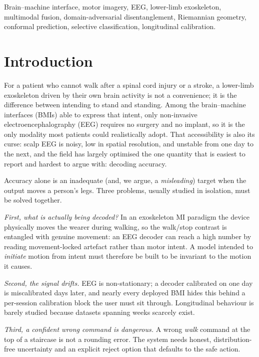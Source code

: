 \documentclass[conference]{IEEEtran}
\begin{document}
\begin{IEEEkeywords}
Brain--machine interface, motor imagery, EEG, lower-limb exoskeleton, multimodal
fusion, domain-adversarial disentanglement, Riemannian geometry, conformal
prediction, selective classification, longitudinal calibration.
\end{IEEEkeywords}

\section{Introduction}
For a patient who cannot walk after a spinal cord injury or a
stroke, a lower-limb exoskeleton driven by their own brain activity is not a
convenience; it is the difference between intending to stand and standing. Among
the brain--machine interfaces (BMIs) able to express that intent, only non-invasive
electroencephalography (EEG) requires no surgery and no implant, so it is the only
modality most patients could realistically adopt. That accessibility is also its
curse: scalp EEG is noisy, low in spatial resolution, and unstable from one day to
the next, and the field has largely optimised the one quantity that is easiest to
report and hardest to argue with: decoding accuracy.

Accuracy alone is an inadequate (and, we argue, a \emph{misleading}) target when
the output moves a person's legs. Three problems, usually studied in isolation, must
be solved together.

\emph{First, what is actually being decoded?} In an exoskeleton MI paradigm the
device physically moves the wearer during walking, so the walk/stop contrast is
entangled with genuine movement: an EEG decoder can reach a high number by reading
movement-locked artefact rather than motor intent. A model intended to
\emph{initiate} motion from intent must therefore be built to be invariant to the
motion it causes.

\emph{Second, the signal drifts.} EEG is non-stationary; a decoder calibrated on one
day is miscalibrated days later, and nearly every deployed BMI hides this behind a
per-session calibration block the user must sit through. Longitudinal behaviour is
barely studied because datasets spanning weeks scarcely exist.

\emph{Third, a confident wrong command is dangerous.} A wrong \emph{walk} command at
the top of a staircase is not a rounding error. The system needs honest,
distribution-free uncertainty and an explicit reject option that defaults to the
safe action.
\end{document}
